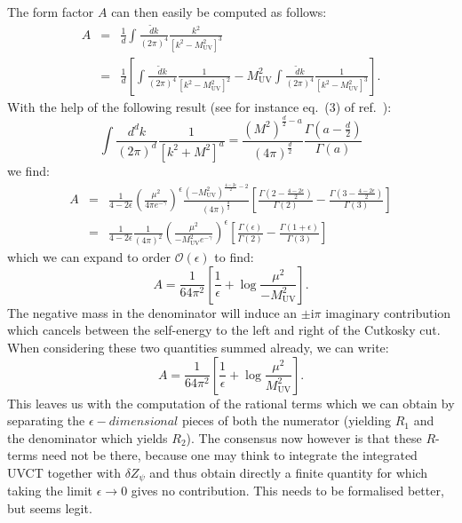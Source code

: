 \documentclass[11pt]{article}
\begin{document}
The form factor $A$ can then easily be computed as follows:
\begin{eqnarray}
A&=&\frac{1}{d} \int \frac{\tilde{d} k}{(2\pi)^4} \frac{ k^2 }{\left[ k^2-M_\textrm{UV}^2\right]^3} \nonumber\\
&=&\frac{1}{d} \left [ 
\int\frac{\tilde{d} k}{(2\pi)^4} \frac{ 1 }{\left[ k^2-M_\textrm{UV}^2\right]^2} 
-M_\textrm{UV}^2 \int \frac{\tilde{d} k}{(2\pi)^4} \frac{ 1 }{\left[ k^2-M_\textrm{UV}^2\right]^3} 
\right ].
\end{eqnarray}
With the help of the following result (see for instance eq.~(3) of ref.~\cite{Steinhauser:2000ry}):
\begin{equation}
\int \frac{d^d k}{(2\pi)^d} \frac{ 1 }{\left[ k^2+M^2\right]^a} =\frac{(M^2)^{\frac{d}{2}-a}}{(4\pi)^\frac{d}{2}}\frac{\Gamma(a-\frac{d}{2})}{\Gamma(a)}
\end{equation}
we find:
\begin{eqnarray}
A&=&\frac{1}{4-2\epsilon}\left(\frac{\mu^2}{4\pi e^{-\gamma}}\right)^{\epsilon} \frac{(-M_\textrm{UV}^2)^{\frac{4-2\epsilon}{2}-2}}{(4\pi)^\frac{d}{2}} \left [ 
\frac{\Gamma(2-\frac{4-2\epsilon}{2})}{\Gamma(2)} - \frac{\Gamma(3-\frac{4-2\epsilon}{2})}{\Gamma(3)}
\right] \nonumber \\
&=&\frac{1}{4-2\epsilon} \frac{1}{(4\pi)^2}\left(\frac{\mu^2}{-M_\textrm{UV}^2 e^{-\gamma}}\right)^{\epsilon}\left [ 
\frac{\Gamma(\epsilon)}{\Gamma(2)} - \frac{\Gamma(1+\epsilon)}{\Gamma(3)}
\right] 
\end{eqnarray}
which we can expand to order $\mathcal{O}(\epsilon)$ to find:
\begin{equation}
A=\frac{1}{64\pi^2}\left[ \frac{1}{\epsilon} + \log{\frac{\mu^2}{-M_\textrm{UV}^2}} \right].
\end{equation}
The negative mass in the denominator will induce an $\pm\textrm{i}\pi$ imaginary contribution which cancels between the self-energy to the left and right of the Cutkosky cut. When considering these two quantities summed already, we can write:
 \begin{equation}
A=\frac{1}{64\pi^2}\left[ \frac{1}{\epsilon} + \log{\frac{\mu^2}{M_\textrm{UV}^2}} \right]. \label{eq:FinalAConstantExpr}
\end{equation}
This leaves us with the computation of the rational terms which we can obtain by separating the $\epsilon-dimensional$ pieces of both the numerator (yielding $R_1$ and the denominator which yields $R_2$).
The consensus now however is that these $R$-terms need not be there, because one may think to integrate the integrated UVCT together with $\delta Z_\psi$ and thus obtain directly a finite quantity for which taking the limit $\epsilon\rightarrow 0$ gives no contribution. This needs to be formalised better, but seems legit.
\end{document}
